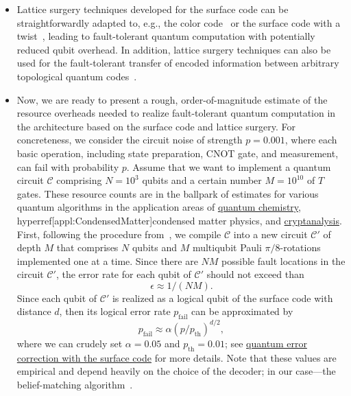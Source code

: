 \begin{refsection}
\begin{itemize}
\item Lattice surgery techniques developed for the surface code can be straightforwardly adapted to, e.g., the color code~\cite{landahl2014colorCodeLatticeSurgery} or the surface code with a twist~\cite{yoder2017surfaceCodeTwist}, leading to fault-tolerant quantum computation with potentially reduced qubit overhead.
In addition, lattice surgery techniques can also be used for the fault-tolerant transfer of encoded information between arbitrary topological quantum codes~\cite{poulsenNautrup2017faultTolerantInterface}.
\item 
Now, we are ready to present a rough, order-of-magnitude estimate of the resource overheads needed to realize fault-tolerant quantum computation in the architecture based on the surface code and lattice surgery.
For concreteness, we consider the circuit noise of strength $p=0.001$, where each basic operation, including state preparation, CNOT gate, and measurement, can fail with probability $p$.
Assume that we want to implement a quantum circuit $\mathcal C$ comprising $N=10^3$ qubits and a certain number $M=10^{10}$ of $T$ gates. These resource counts are in the ballpark of estimates for various quantum algorithms in the application areas of \hyperref[appl:QuantumChemistry]{quantum chemistry}, hyperref[appl:CondensedMatter]{condensed matter physics}, and \hyperref[appl:cryptanalysis]{cryptanalysis}.
First, following the procedure from~\cite{litinski2019gameofsurfacecodes}, we compile $\mathcal C$ into a new circuit $\mathcal C'$ of depth $M$ that comprises $N$ qubits and $M$ multiqubit Pauli $\pi/8$-rotations implemented one at a time.
Since there are $NM$ possible fault locations in the circuit $\mathcal C'$, the error rate for each qubit of $\mathcal C'$ should not exceed than
\begin{equation}
\epsilon \approx 1/(N M).
\end{equation}
Since each qubit of $\mathcal C'$ is realized as a logical qubit of the surface code with distance $d$, then its
logical error rate $p_\text{fail}$ can be approximated by 
\begin{equation}
p_\text{fail} \approx \alpha (p/p_\text{th})^{d/2},
\end{equation}
where we can crudely set $\alpha = 0.05$ and $p_\text{th} = 0.01$; see \hyperref[prim:QEC]{quantum error correction with the surface code} for more details.
Note that these values are empirical and depend heavily on the choice of the decoder; in our case---the belief-matching algorithm~\cite{higgott2023improvedDecodingCircuitNoise}.

\end{itemize}
\end{refsection}
